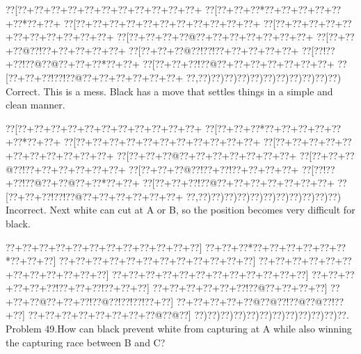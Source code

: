 \documentclass[a5paper]{article}
\begin{document}
\begin{center}
{\goo
\0??[\0??+\0??+\0??+\0??+\0??+\0??+\0??+\0??+\0??+\0??+\0??+
\0??[\0??+\0??+\0??*\0??+\0??+\0??+\0??+\0??+\0??*\0??+\0??+
\0??[\0??+\0??+\0??+\0??+\0??+\0??+\0??+\0??+\0??+\0??+\0??+
\0??[\0??+\0??+\0??+\0??+\0??+\0??+\0??+\0??+\0??+\0??+\0??+
\0??[\0??+\0??+\0??+\0??@\0??+\0??+\0??+\0??+\0??+\0??+\0??+
\0??[\0??+\0??+\0??@\0??!\0??+\0??+\0??+\0??+\0??+
\0??[\0??+\0??+\0??@\0??!\0??!\0??+\0??+\0??+\0??+\0??+
\0??[\0??!\0??+\0??!\0??@\0??@\0??+\0??+\0??*\0??+\0??+
\0??[\0??+\0??+\0??!\0??@\0??+\0??+\0??+\0??+\0??+\0??+\0??+
\0??[\0??+\0??+\0??!\0??!\0??@\0??+\0??+\0??+\0??+\0??+\0??+
\0??,\0??)\0??)\0??)\0??)\0??)\0??)\0??)\0??)\0??)\0??)\0??)
}
Correct. This is a mess. Black has a move that settles things in a simple and clean manner.

\end{center}
\begin{center}
{\goo
\0??[\0??+\0??+\0??+\0??+\0??+\0??+\0??+\0??+\0??+\0??+\0??+
\0??[\0??+\0??+\0??*\0??+\0??+\0??+\0??+\0??+\0??*\0??+\0??+
\0??[\0??+\0??+\0??+\0??+\0??+\0??+\0??+\0??+\0??+\0??+\0??+
\0??[\0??+\0??+\0??+\0??+\0??+\0??+\0??+\0??+\0??+\0??+\0??+
\0??[\0??+\0??+\0??@\0??+\0??+\0??+\0??+\0??+\0??+\0??+
\0??[\0??+\0??+\0??@\0??!\0??+\0??+\0??+\0??+\0??+\0??+
\0??[\0??+\0??+\0??@\0??!\0??+\0??!\0??+\0??+\0??+\0??+
\0??[\0??!\0??+\0??!\0??@\0??+\0??@\0??+\0??*\0??+\0??+
\0??[\0??+\0??+\0??!\0??@\0??+\0??+\0??+\0??+\0??+\0??+\0??+
\0??[\0??+\0??+\0??!\0??!\0??@\0??+\0??+\0??+\0??+\0??+\0??+
\0??,\0??)\0??)\0??)\0??)\0??)\0??)\0??)\0??)\0??)\0??)\0??)
}
Incorrect. Next white can cut at A or B, so the position becomes very difficult for black.

\end{center}
\newpage
\begin{center}
{\goo
\0??+\0??+\0??+\0??+\0??+\0??+\0??+\0??+\0??+\0??+\0??+\0??]
\0??+\0??+\0??*\0??+\0??+\0??+\0??+\0??+\0??*\0??+\0??+\0??]
\0??+\0??+\0??+\0??+\0??+\0??+\0??+\0??+\0??+\0??+\0??+\0??]
\0??+\0??+\0??+\0??+\0??+\0??+\0??+\0??+\0??+\0??+\0??+\0??]
\0??+\0??+\0??+\0??+\0??+\0??+\0??+\0??+\0??+\0??+\0??+\0??]
\0??+\0??+\0??+\0??+\0??+\0??!\0??+\0??+\0??!\0??+\0??+\0??]
\0??+\0??+\0??+\0??+\0??+\0??!\0??@\0??+\0??+\0??+\0??]
\0??+\0??+\0??@\0??+\0??+\0??!\0??@\0??!\0??!\0??!\0??+\0??]
\0??+\0??+\0??+\0??+\0??@\0??@\0??!\0??@\0??@\0??!\0??+\0??]
\0??+\0??+\0??+\0??+\0??+\0??+\0??+\0??@\0??@\0??]
\0??)\0??)\0??)\0??)\0??)\0??)\0??)\0??)\0??)\0??)\0??)\0??.
}
Problem 49.How can black prevent white from capturing at A while also winning the capturing race between B and C?

\end{center}
\end{document}

